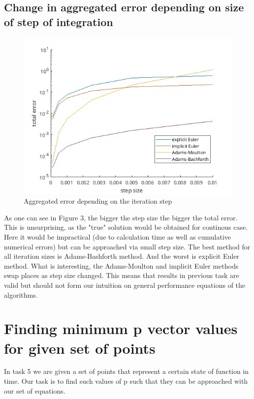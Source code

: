 \documentclass[11pt]{article}
\begin{document}
\subsection{Change in aggregated error depending on size of step of integration}
\begin{figure}[ht!]
    \includegraphics[width=\textwidth]{./errorOnStepSize.jpg}
    \caption{Aggregated error depending on the iteration step}
    \label{fig:errorOnStepSize}
\end{figure}

As one can see in Figure 3, the bigger the step size the bigger the total error.
This is unsurprising, as the "true" solution would be obtained for continous case.
Here it would be impractical (due to calculation time as well as cumulative
numerical errors) but can be approached via small step size.
The best method for all iteration sizes is Adams-Bashforth method. And the
worst is explicit Euler method. What is interesting, the Adams-Moulton and
implicit Euler methods swap places as step size changed. This means that
results in previous task are valid but should not form our intuition on general
performance equations of the algorithms.

\section{Finding minimum p vector values for given set of points}
In task 5 we are given a set of points that represent a certain state of function in time.
Our task is to find such values of p such that they can be approached with our set of equations.
\end{document}
